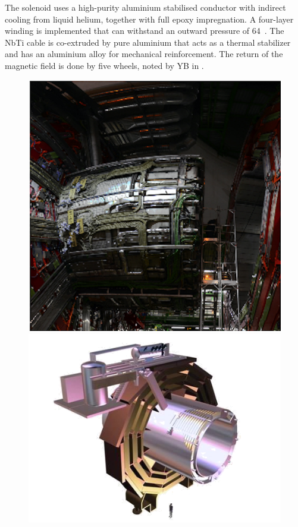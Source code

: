 	The solenoid uses a high-purity aluminium stabilised conductor with indirect cooling from liquid helium, together with full epoxy impregnation. A four-layer winding is implemented that can withstand an outward pressure of 64~\atm. The NbTi cable is co-extruded by pure aluminium that acts as a thermal stabilizer and has an aluminium alloy for mechanical reinforcement. The return of the magnetic field is done by five wheels, noted by YB in .
	\begin{figure}[htbp]
		\centering
		\begin{minipage}{0.6\textwidth}
		\includegraphics[width=1.\textwidth]{2_ExperimentalSetup/Figures/solenoid.png}
	\end{minipage}
		\begin{minipage}{0.39\textwidth}
		\includegraphics[width=\textwidth]{2_ExperimentalSetup/Figures/839_1a}

\end{minipage}
\end{figure}
